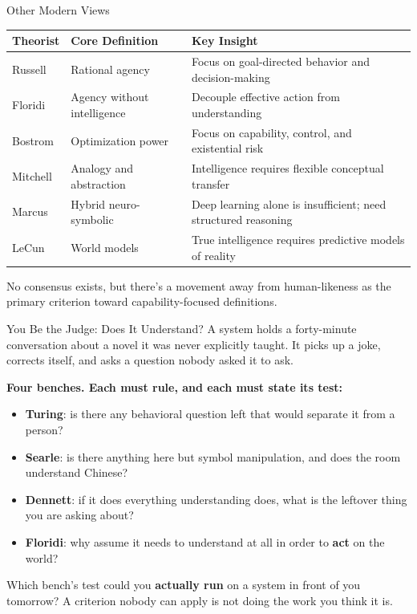 ﻿\documentclass[aspectratio=169,11pt]{beamer}
\begin{document}
\begin{frame}{Other Modern Views}
\begin{table}[h]
\centering
\scriptsize
\begin{tabular}{@{}p{2cm}p{4cm}p{6cm}@{}}
\toprule
\textbf{Theorist} & \textbf{Core Definition} & \textbf{Key Insight} \\
\midrule
Russell & Rational agency & Focus on goal-directed behavior and decision-making \\
\addlinespace
Floridi & Agency without intelligence & Decouple effective action from understanding \\
\addlinespace
Bostrom & Optimization power & Focus on capability, control, and existential risk \\
\addlinespace
Mitchell & Analogy and abstraction & Intelligence requires flexible conceptual transfer \\
\addlinespace
Marcus & Hybrid neuro-symbolic & Deep learning alone is insufficient; need structured reasoning \\
\addlinespace
LeCun & World models & True intelligence requires predictive models of reality \\
\bottomrule
\end{tabular}
\end{table}

\vspace{0.2em}
No consensus exists, but there's a movement away from human-likeness as the primary criterion toward capability-focused definitions.
\end{frame}
\begin{frame}[shrink=8]{You Be the Judge: Does It Understand?}
A system holds a forty-minute conversation about a novel it was never explicitly taught. It picks up a joke, corrects itself, and asks a question nobody asked it to ask.

\vspace{0.2em}
\textbf{Four benches. Each must rule, and each must state its test:}
\begin{itemize}
    \item \textbf{Turing}: is there any behavioral question left that would separate it from a person?
    \item \textbf{Searle}: is there anything here but symbol manipulation, and does the room understand Chinese?
    \item \textbf{Dennett}: if it does everything understanding does, what is the leftover thing you are asking about?
    \item \textbf{Floridi}: why assume it needs to understand at all in order to \textbf{act} on the world?
\end{itemize}

\begin{discussionbox}
Which bench's test could you \textbf{actually run} on a system in front of you tomorrow? A criterion nobody can apply is not doing the work you think it is.
\end{discussionbox}
\end{frame}
\end{document}
